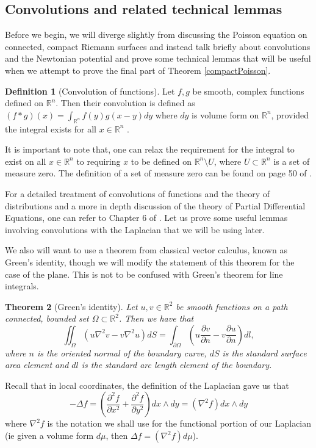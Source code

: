 \documentclass[11pt]{report}
\newtheorem{thm}{Theorem}[section]
\theoremstyle{definition}
\newtheorem{defn}[thm]{Definition}
\begin{document}
\subsection{Convolutions and related technical lemmas}
Before we begin, we will diverge slightly from discussing the Poisson equation on connected, compact Riemann surfaces and instead talk briefly about convolutions and the Newtonian potential and prove some technical lemmas that will be useful when we attempt to prove the final part of Theorem \ref{compactPoisson}.
\begin{defn}[Convolution of functions]\label{ConvolutionDefn}
  Let $f,g$ be smooth, complex functions defined on $\mathbb{R}^n$. Then their convolution is defined as $(f * g)(x) = \int_{\mathbb{R}^n}f(y)g(x-y)dy$ where $dy$ is volume form on $\mathbb{R}^n$, provided the integral exists for all $x \in \mathbb{R}^n$ .
\end{defn}
It is important to note that, one can relax the requirement for the integral to exist on all $x \in \mathbb{R}^n$ to requiring $x$ to be defined on $\mathbb{R}^n\setminus{U}$, where $U \subset \mathbb{R}^n$ is a set of measure zero. The definition of a set of measure zero can be found on page 50 of \cite{spivak}.

For a detailed treatment of convolutions of functions and the theory of distributions and a more in depth discussion of the theory of Partial Differential Equations, one can refer to Chapter 6 of \cite{rudin}.  
Let us prove some useful lemmas involving convolutions with the Laplacian that we will be using later. 

We also will want to use a theorem from classical vector calculus, known as Green's identity, though we will modify the statement of this theorem for the case of the plane. This is not to be confused with Green's theorem for line integrals.
\begin{thm}[Green's identity]
  Let $u,v \in \mathbb{R}^2$ be smooth functions on a path connected, bounded set $\Omega \subset \mathbb{R}^2$. Then we have that  
  \[\iint_{\Omega} (u \nabla^2 v - v \nabla^2 u) dS= \int_{\partial \Omega} \left(u \frac{\partial v}{\partial n} - v \frac{\partial u}{\partial n}\right) dl, \] 
  where $n$ is the oriented normal of the boundary curve, $dS$ is the standard surface area element and $dl$ is the standard arc length element of the boundary.
\end{thm}
Recall that in local coordinates, the definition of the Laplacian gave us that \[-\Delta f = (\frac{\partial^2 f}{\partial x^2} + \frac{\partial^2 f}{\partial y^2}) dx\wedge dy = (\nabla^2f) dx\wedge dy\]
where $\nabla^2f$ is the notation we shall use for the functional portion of our Laplacian (ie given a volume form $d\mu$, then $\Delta f = (\nabla^2 f) d\mu$).
\end{document}
